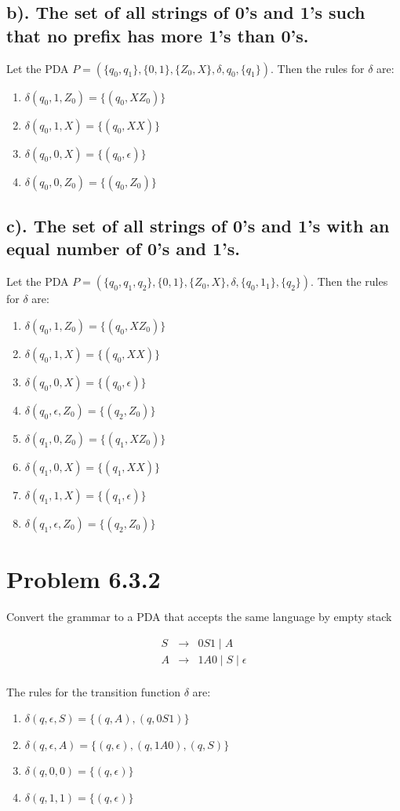 \documentclass[20pt]{article} %
\begin{document}
\subsection{b). The set of all strings of 0's and 1's such that no prefix has more 1's than 0's.}
Let the PDA $\!P = (\{q_0, q_1\}, \{0,1\}, \{Z_0, X\}, \delta, q_0, \{q_1\})$. Then the rules for $\delta$ are: \\
\begin{enumerate}
\item $\delta(q_0, 1, Z_0) = \{(q_0, XZ_0)\}$
\item $\delta(q_0, 1, X) = \{(q_0, XX)\}$
\item $\delta(q_0, 0, X) = \{(q_0, \epsilon)\}$
\item $\delta(q_0, 0, Z_0) = \{(q_0, Z_0)\}$
\end{enumerate}
\newpage
\subsection{c). The set of all strings of 0's and 1's with an equal number of 0's and 1's.}
Let the PDA $\!P = (\{q_0, q_1, q_2\}, \{0,1\}, \{Z_0, X\}, \delta, \{q_0, 1_1\}, \{q_2\})$. Then the rules for $\delta$ are: \\
\begin{enumerate}
\item $\delta(q_0, 1, Z_0) = \{(q_0, XZ_0)\}$
\item $\delta(q_0, 1, X) = \{(q_0, XX)\}$
\item $\delta(q_0, 0, X) = \{(q_0, \epsilon)\}$
\item $\delta(q_0, \epsilon, Z_0) = \{(q_2, Z_0)\}$
\item $\delta(q_1, 0, Z_0) = \{(q_1, XZ_0)\}$
\item $\delta(q_1, 0, X) = \{(q_1, XX)\}$
\item $\delta(q_1, 1, X) = \{(q_1, \epsilon)\}$
\item $\delta(q_1, \epsilon, Z_0) = \{(q_2, Z_0)\}$
\end{enumerate}
\section{Problem 6.3.2}
Convert the grammar to a PDA that accepts the same language by empty stack \\
 \begin{table}[!htbp]
 \[\begin{array}{ccc} 
 S & \rightarrow & 0S1 \mid A \\
 A & \rightarrow & 1A0 \mid S \mid \epsilon \\
 \end{array}\]
 \end{table}
The rules for the transition function $\delta$ are: \\
\begin{enumerate}
\item $\delta(q, \epsilon, S) = \{(q, A), (q, 0S1)\}$
\item $\delta(q, \epsilon, A) = \{(q, \epsilon), (q, 1A0), (q, S)\}$
\item $\delta(q, 0, 0) = \{(q, \epsilon)\}$
\item $\delta(q, 1, 1) = \{(q, \epsilon)\}$
\end{enumerate}
\newpage
\end{document}
